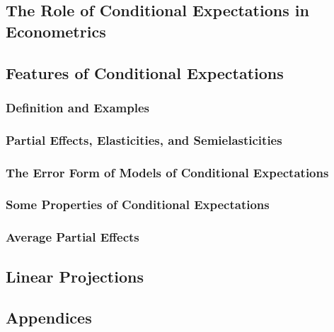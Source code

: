 \documentclass[11pt, oneside, a4paper, article]{article}
\numberwithin{equation}{section}
\begin{document}
\subsection{The Role of Conditional Expectations in Econometrics}

\subsection{Features of Conditional Expectations}

\subsubsection{Definition and Examples}

\subsubsection{Partial Effects, Elasticities, and Semielasticities}

\subsubsection{The Error Form of Models of Conditional Expectations}

\subsubsection{Some Properties of Conditional Expectations}

\subsubsection{Average Partial Effects}

\subsection{Linear Projections}

\subsection{Appendices}
\end{document}

